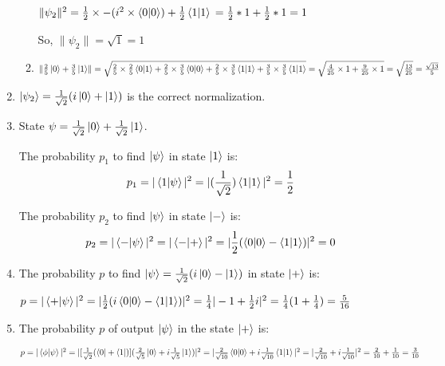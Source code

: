 \documentclass{article}
\begin{document}
\begin{enumerate}
\begin{enumerate}
        $\lVert\psi_2\rVert^2
        \\=\frac{1}{2}\times -(i^2\times\braket{0|0})+\frac{1}{2}\braket{1|1}
        \\=\frac{1}{2}*1+\frac{1}{2}*1
        \\=1
        $

        So, $\lVert\psi_2\rVert=\sqrt{1}=1$
    \item $\lVert\frac{2}{5}\ket{0}+\frac{3}{5}\ket{1}\rVert
    \\=\sqrt{\frac{2}{5}\times\frac{2}{5}\braket{0|1}+\frac{2}{5}\times\frac{3}{5}\braket{0|0}+\frac{2}{5}\times\frac{3}{5}\braket{1|1}+\frac{3}{5}\times\frac{3}{5}\braket{1|1}}
    \\=\sqrt{\frac{4}{25}\times1+\frac{9}{25}\times1}
    \\=\sqrt{\frac{13}{25}}
    \\=\frac{\sqrt{13}}{5}
    $
    \end{enumerate}
    \item $\ket{\psi_2}=\frac{1}{\sqrt{2}}(i\ket{0}+\ket{1})$ is the correct normalization.
    \item State $\psi=\frac{1}{\sqrt{2}}\ket{0}+\frac{1}{\sqrt{2}}\ket{1}$.
    
    The probability $p_1$ to find $\ket{\psi}$ in state $\ket{1}$ is:
\[p_1=|\braket{1|\psi}|^2=|(\frac{1}{\sqrt{2}})\braket{1|1}|^2=\frac{1}{2}\]


The probability $p_2$ to find $\ket{\psi}$ in state $\ket{-}$ is:
\[p_2=|\braket{-|\psi}|^2=|\braket{-|+}|^2=|\frac{1}{2}(\braket{0|0}-\braket{1|1})|^2=0\]

\item The probability $p$ to find $\ket{\psi}=\frac{1}{\sqrt{2}}(i\ket{0}-\ket{1})$ in state $\ket{+}$ is:

$p=|\braket{+|\psi}|^2=|\frac{1}{2}(i\braket{0|0}-\braket{1|1})|^2=\frac{1}{4}|-1+\frac{1}{2}i|^2=\frac{1}{4}(1+\frac{1}{4})=\frac{5}{16}$

\item The probability $p$ of output $\ket{\psi}$ in the state $\ket{+}$ is:

$p=|\braket{\phi|\psi}|^2=|[\frac{1}{\sqrt{2}}(\bra{0}+\bra{1})](\frac{2}{\sqrt{5}}\ket{0}+i\frac{1}{\sqrt{5}}\ket{1})|^2
\\=|\frac{2}{\sqrt{10}}\braket{0|0}+i\frac{1}{\sqrt{10}}\braket{1|1}|^2
\\=|\frac{2}{\sqrt{10}}+i\frac{1}{\sqrt{10}}|^2
\\=\frac{2}{10}+\frac{1}{10}
\\=\frac{3}{10}
$
\end{enumerate}
\end{document}
